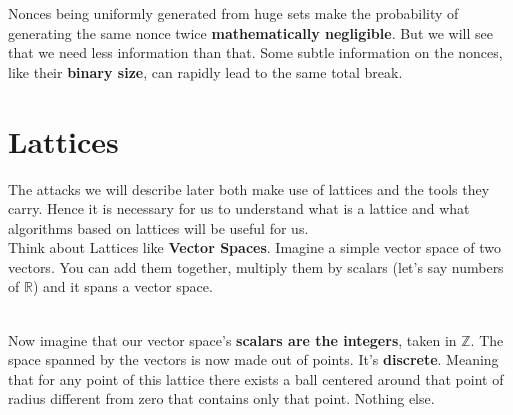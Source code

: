 \documentclass[a4paper,11pt]{article}
\begin{document}
Nonces being uniformly generated from huge sets make the probability of generating the same nonce twice \textbf{mathematically negligible}. But we will see that we need less information than that. Some subtle information on the nonces, like their \textbf{binary size}, can rapidly lead to the same total break.

\section{Lattices}

The attacks we will describe later both make use of lattices and the tools they carry. Hence it is necessary for us to understand what is a lattice and what algorithms based on lattices will be useful for us.\\
Think about Lattices like \textbf{Vector Spaces}. Imagine a simple vector space of two vectors. You can add them together, multiply them by scalars (let's say numbers of $\mathbb{R}$) and it spans a vector space.\\

\\

Now imagine that our vector space's \textbf{scalars are the integers}, taken in $\mathbb{Z}$. The space spanned by the vectors is now made out of points. It's \textbf{discrete}. Meaning that for any point of this lattice there exists a ball centered around that point of radius different from zero that contains only that point. Nothing else.\\
\end{document}
